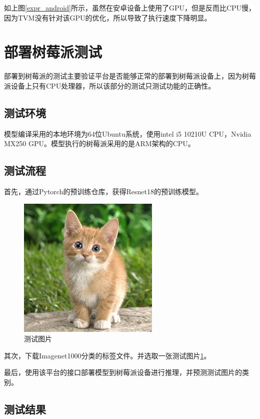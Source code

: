 如上图\ref{expr_android}所示，虽然在安卓设备上使用了GPU，但是反而比CPU慢，因为TVM没有针对该GPU的优化，所以导致了执行速度下降明显。


\section{部署树莓派测试}

部署到树莓派的测试主要验证平台是否能够正常的部署到树莓派设备上，因为树莓派设备上只有CPU处理器，所以该部分的测试只测试功能的正确性。

\subsection{测试环境}

模型编译采用的本地环境为64位Ubuntu系统，使用intel i5 10210U CPU，Nvidia MX250 GPU。模型执行的树莓派采用的是ARM架构的CPU。


\subsection{测试流程}

首先，通过Pytorch的预训练仓库，获得Resnet18的预训练模型。

\begin{figure}[h!]
    \centering
    \includegraphics[width=180bp]{figure/cat.png}
    \caption{测试图片}
    \label{cat}
\end{figure}

其次，下载Imagenet1000分类的标签文件。并选取一张测试图片\ref{cat}。

最后，使用该平台的接口部署模型到树莓派设备进行推理，并预测测试图片的类别。


\subsection{测试结果}


